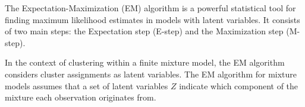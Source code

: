 \documentclass{article}
\begin{document}





The Expectation-Maximization (EM) algorithm is a powerful statistical tool for finding maximum likelihood estimates in models with latent variables. It consists of two main steps: the Expectation step (E-step) and the Maximization step (M-step).

In the context of clustering within a finite mixture model, the EM algorithm considers cluster assignments as latent variables. 
The EM algorithm for mixture models assumes that a set of latent variables $Z$ indicate which component of the mixture each observation originates from.
\end{document}
